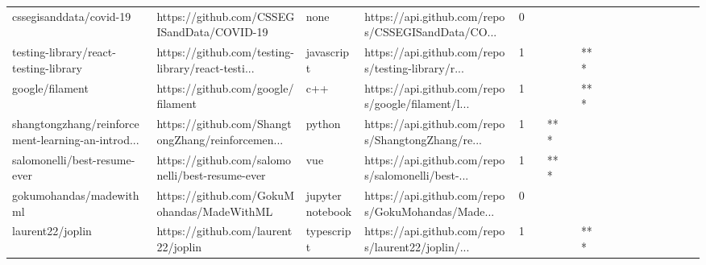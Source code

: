 \begin{tabular}{llllrlllllllllllll}
cssegisanddata/covid-19                            &         https://github.com/CSSEGISandData/COVID-19 &              none &  https://api.github.com/repos/CSSEGISandData/CO... &       0 &         &        &           &                &                 &        &           &           &          &          &       &              &          \\
testing-library/react-testing-library              &  https://github.com/testing-library/react-testi... &        javascript &  https://api.github.com/repos/testing-library/r... &       1 &         &        &           &            *** &                 &        &           &           &          &          &       &              &          \\
google/filament                                    &                 https://github.com/google/filament &               c++ &  https://api.github.com/repos/google/filament/l... &       1 &         &        &           &            *** &                 &        &           &           &          &          &       &              &          \\
shangtongzhang/reinforcement-learning-an-introd... &  https://github.com/ShangtongZhang/reinforcemen... &            python &  https://api.github.com/repos/ShangtongZhang/re... &       1 &         &    *** &           &                &                 &        &           &           &          &          &       &              &          \\
salomonelli/best-resume-ever                       &    https://github.com/salomonelli/best-resume-ever &               vue &  https://api.github.com/repos/salomonelli/best-... &       1 &         &    *** &           &                &                 &        &           &           &          &          &       &              &          \\
gokumohandas/madewithml                            &         https://github.com/GokuMohandas/MadeWithML &  jupyter notebook &  https://api.github.com/repos/GokuMohandas/Made... &       0 &         &        &           &                &                 &        &           &           &          &          &       &              &          \\
laurent22/joplin                                   &                https://github.com/laurent22/joplin &        typescript &  https://api.github.com/repos/laurent22/joplin/... &       1 &         &        &           &            *** &                 &        &           &           &          &          &       &              &          \\

\end{tabular}
